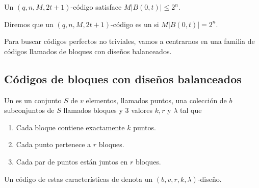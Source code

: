 \begin{theorem}
	Un $(q, n, M, 2t+1)$-código satisface $M|B(0, t)|\leq 2^n$.
\end{theorem}

\begin{definition}
	Diremos que un $(q, n, M, 2t+1)$-código es un  si $M|B(0, t)|= 2^n$.
\end{definition}

Para buscar códigos perfectos no triviales, vamos a centrarnos en una familia de códigos llamados de bloques con diseños balanceados.

\subsection{Códigos de bloques con diseños balanceados}
\begin{definition}
Un  es un conjunto $S$ de $v$ elementos, llamados puntos, una colección de $b$ subconjuntos de $S$ llamados bloques y 3 valores $k, r$ y $\lambda$ tal que
	\begin{enumerate}
		\item Cada bloque contiene exactamente $k$ puntos.
		\item Cada punto pertenece a $r$ bloques.
		\item Cada par de puntos están juntos en $r$ bloques.
	\end{enumerate}
	Un código de estas características de denota un $(b, v, r, k, \lambda)$-diseño.
\end{definition}

